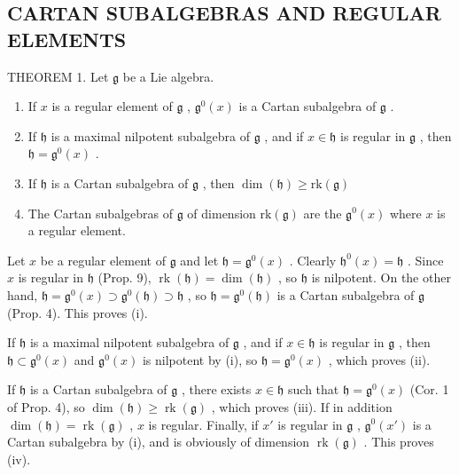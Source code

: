 \subsection{CARTAN SUBALGEBRAS AND REGULAR ELEMENTS}

THEOREM 1. Let \(\mathfrak{g}\) be a Lie algebra.

\begin{enumerate}
\def\labelenumi{(\roman{enumi})}
\item
  If \(x\) is a regular element of \(\mathfrak{g}\) , \(\mathfrak{g}^0(x)\) is a Cartan subalgebra of \(\mathfrak{g}\) .
\item
  If \(\mathfrak{h}\) is a maximal nilpotent subalgebra of \(\mathfrak{g}\) , and if \(x \in \mathfrak{h}\) is regular in \(\mathfrak{g}\) , then \(\mathfrak{h} = \mathfrak{g}^0(x)\) .
\item
  If \(\mathfrak{h}\) is a Cartan subalgebra of \(\mathfrak{g}\) , then \(\dim (\mathfrak{h})\geq \mathrm{rk}(\mathfrak{g})\)
\item
  The Cartan subalgebras of \(\mathfrak{g}\) of dimension \(\mathrm{rk}(\mathfrak{g})\) are the \(\mathfrak{g}^0 (x)\) where \(x\) is a regular element.
\end{enumerate}

Let \(x\) be a regular element of \(\mathfrak{g}\) and let \(\mathfrak{h} = \mathfrak{g}^0(x)\) . Clearly \(\mathfrak{h}^0(x) = \mathfrak{h}\) . Since \(x\) is regular in \(\mathfrak{h}\) (Prop. 9), \(\operatorname{rk}(\mathfrak{h}) = \dim(\mathfrak{h})\) , so \(\mathfrak{h}\) is nilpotent. On the other hand, \(\mathfrak{h} = \mathfrak{g}^0(x) \supset \mathfrak{g}^0(\mathfrak{h}) \supset \mathfrak{h}\) , so \(\mathfrak{h} = \mathfrak{g}^0(\mathfrak{h})\) is a Cartan subalgebra of \(\mathfrak{g}\) (Prop. 4). This proves (i).

If \(\mathfrak{h}\) is a maximal nilpotent subalgebra of \(\mathfrak{g}\) , and if \(x\in \mathfrak{h}\) is regular in \(\mathfrak{g}\) , then \(\mathfrak{h}\subset \mathfrak{g}^0 (x)\) and \(\mathfrak{g}^0 (x)\) is nilpotent by (i), so \(\mathfrak{h} = \mathfrak{g}^0 (x)\) , which proves (ii).

If \(\mathfrak{h}\) is a Cartan subalgebra of \(\mathfrak{g}\) , there exists \(x \in \mathfrak{h}\) such that \(\mathfrak{h} = \mathfrak{g}^0(x)\) (Cor. 1 of Prop. 4), so \(\dim(\mathfrak{h}) \geq \operatorname{rk}(\mathfrak{g})\) , which proves (iii). If in addition \(\dim(\mathfrak{h}) = \operatorname{rk}(\mathfrak{g})\) , \(x\) is regular. Finally, if \(x'\) is regular in \(\mathfrak{g}\) , \(\mathfrak{g}^0(x')\) is a Cartan subalgebra by (i), and is obviously of dimension \(\operatorname{rk}(\mathfrak{g})\) . This proves (iv).

